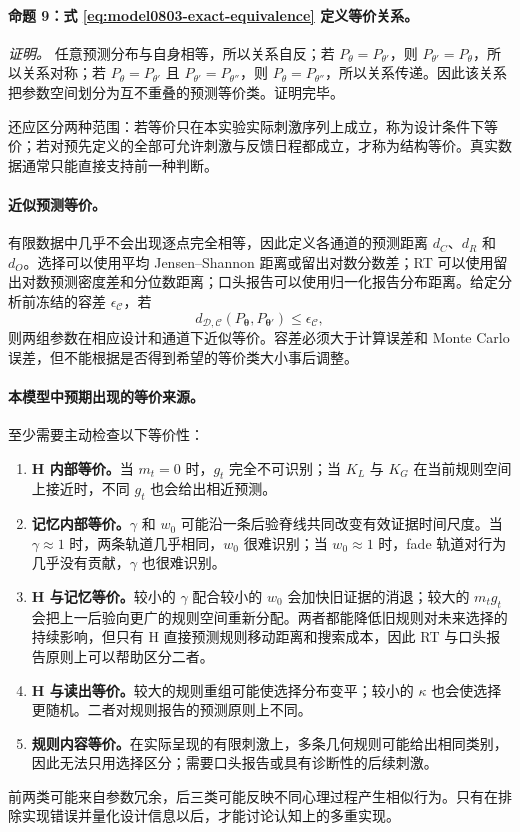 \paragraph{命题 9：式 \ref{eq:model0803-exact-equivalence} 定义等价关系。}

\textit{证明。}
任意预测分布与自身相等，所以关系自反；若 $P_\theta=P_{\theta'}$，则 $P_{\theta'}=P_\theta$，所以关系对称；若 $P_\theta=P_{\theta'}$ 且 $P_{\theta'}=P_{\theta''}$，则 $P_\theta=P_{\theta''}$，所以关系传递。因此该关系把参数空间划分为互不重叠的预测等价类。证明完毕。

还应区分两种范围：若等价只在本实验实际刺激序列上成立，称为设计条件下等价；若对预先定义的全部可允许刺激与反馈日程都成立，才称为结构等价。真实数据通常只能直接支持前一种判断。

\paragraph{近似预测等价。}
有限数据中几乎不会出现逐点完全相等，因此定义各通道的预测距离 $d_C$、$d_R$ 和 $d_O$。选择可以使用平均 Jensen--Shannon 距离或留出对数分数差；RT 可以使用留出对数预测密度差和分位数距离；口头报告可以使用归一化报告分布距离。给定分析前冻结的容差 $\epsilon_{\mathcal C}$，若
\begin{equation}
    d_{\mathcal D,\mathcal C}
    (P_{\boldsymbol\theta},P_{\boldsymbol\theta'})
    \leq\epsilon_{\mathcal C},
    \label{eq:model0803-approx-equivalence}
\end{equation}
则两组参数在相应设计和通道下近似等价。容差必须大于计算误差和 Monte Carlo 误差，但不能根据是否得到希望的等价类大小事后调整。

\paragraph{本模型中预期出现的等价来源。}
至少需要主动检查以下等价性：
\begin{enumerate}
    \item \textbf{H 内部等价。}当 $m_t=0$ 时，$g_t$ 完全不可识别；当 $K_L$ 与 $K_G$ 在当前规则空间上接近时，不同 $g_t$ 也会给出相近预测。
    \item \textbf{记忆内部等价。}$\gamma$ 和 $w_0$ 可能沿一条后验脊线共同改变有效证据时间尺度。当 $\gamma\approx1$ 时，两条轨道几乎相同，$w_0$ 很难识别；当 $w_0\approx1$ 时，fade 轨道对行为几乎没有贡献，$\gamma$ 也很难识别。
    \item \textbf{H 与记忆等价。}较小的 $\gamma$ 配合较小的 $w_0$ 会加快旧证据的消退；较大的 $m_tg_t$ 会把上一后验向更广的规则空间重新分配。两者都能降低旧规则对未来选择的持续影响，但只有 H 直接预测规则移动距离和搜索成本，因此 RT 与口头报告原则上可以帮助区分二者。
    \item \textbf{H 与读出等价。}较大的规则重组可能使选择分布变平；较小的 $\kappa$ 也会使选择更随机。二者对规则报告的预测原则上不同。
    \item \textbf{规则内容等价。}在实际呈现的有限刺激上，多条几何规则可能给出相同类别，因此无法只用选择区分；需要口头报告或具有诊断性的后续刺激。
\end{enumerate}
前两类可能来自参数冗余，后三类可能反映不同心理过程产生相似行为。只有在排除实现错误并量化设计信息以后，才能讨论认知上的多重实现。

